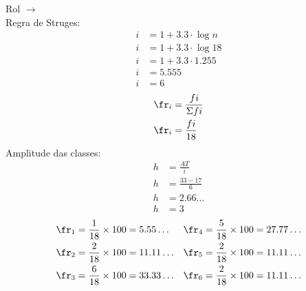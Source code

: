 Rol $\rightarrow$
\\
Regra de Struges:
\begin{align*}
	i & = 1 + 3.3 \cdot \log{n}  \\
	i & = 1 + 3.3 \cdot \log{18} \\
	i & = 1 + 3.3 \cdot 1.255    \\
	i & = 5.555                  \\
	i & = 6
\end{align*}
\begin{align*}
	\fr_i & = \frac{fi}{\Sigma fi} \\
	\fr_i & = \frac{fi}{18}
\end{align*}
Amplitude das classes:
\begin{align*}
	h & = \frac{AT}{i}    \\
	h & = \frac{33-17}{6} \\
	h & = 2.66\dots       \\
	h & = 3
\end{align*}
\begin{align*}
	 & \fr_1 = \frac{1}{18} \times 100 = 5.55\dots  &  & \fr_4 = \frac{5}{18} \times 100 = 27.77\dots \\
	 & \fr_2 = \frac{2}{18} \times 100 = 11.11\dots &  & \fr_5 = \frac{2}{18} \times 100 = 11.11\dots \\
	 & \fr_3 = \frac{6}{18} \times 100 = 33.33\dots &  & \fr_6 = \frac{2}{18} \times 100 = 11.11\dots
\end{align*}
\newpage
